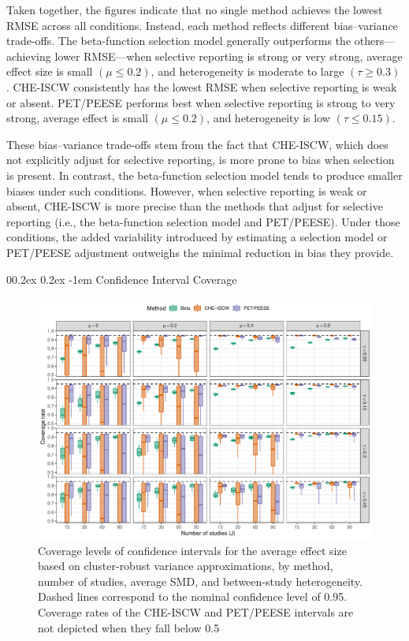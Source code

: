\documentclass[
  american,
  man, donotrepeattitle,floatsintext]{apa7}
\makeatletter
\let\oldparagraph\paragraph
\renewcommand{\paragraph}{
    \@ifstar
      \xxxParagraphStar
      \xxxParagraphNoStar
  }
\newcommand{\xxxParagraphStar}[1]{\oldparagraph*{#1}\mbox{}}
\newcommand{\xxxParagraphNoStar}[1]{\oldparagraph{#1}\mbox{}}
\renewcommand{\paragraph}{\@startsection{paragraph}{4}{\parindent}%
  {0\baselineskip \@plus 0.2ex \@minus 0.2ex}%
  {-1em}%
  {\normalfont\normalsize\bfseries\itshape\typesectitle}}
\makeatother
\begin{document}
Taken together, the figures indicate that no single method achieves the lowest RMSE across all conditions. Instead, each method reflects different bias--variance trade-offs.
The beta-function selection model generally outperforms the others---achieving lower RMSE---when selective reporting is strong or very strong, average effect size is small \((\mu \leq 0.2)\), and heterogeneity is moderate to large \((\tau \geq 0.3)\).
CHE-ISCW consistently has the lowest RMSE when selective reporting is weak or absent.
PET/PEESE performs best when selective reporting is strong to very strong, average effect is small \((\mu \leq 0.2)\), and heterogeneity is low \((\tau \leq 0.15)\).

These bias--variance trade-offs stem from the fact that CHE-ISCW, which does not explicitly adjust for selective reporting, is more prone to bias when selection is present. In contrast, the beta-function selection model tends to produce smaller biases under such conditions. However, when selective reporting is weak or absent, CHE-ISCW is more precise than the methods that adjust for selective reporting (i.e., the beta-function selection model and PET/PEESE). Under those conditions, the added variability introduced by estimating a selection model or PET/PEESE adjustment outweighs the minimal reduction in bias they provide.

\paragraph{Confidence Interval Coverage}\label{confidence-interval-coverage}

\begin{figure}
\includegraphics{beta-function-selection-models-with-dependent-effects_files/figure-latex/comparison-coverage-main-1} \caption{Coverage levels of confidence intervals for the average effect size based on cluster-robust variance approximations, by method, number of studies, average SMD, and between-study heterogeneity. Dashed lines correspond to the nominal confidence level of 0.95. Coverage rates of the CHE-ISCW and PET/PEESE intervals are not depicted when they fall below 0.5}\label{fig:comparison-coverage-main}
\end{figure}
\end{document}
